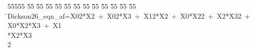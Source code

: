 %
%
\begin{tabbing}
55555 \= 55 \= 55 \= 55 \= 55 \= 55 \= 55 \= 55 \= 55 \= 55 \= 55 \= 55 \= 55 \= \>Dickson26\_eqn\_af=X02*X2\ +\ X02*X3\ +\ X12*X2\ +\ X0*X22\ +\ X2*X32\ +\ X0*X2*X3\ +\ X1\\[0pt]
\>*X2*X3\\[0pt]
2\>\end{tabbing}
